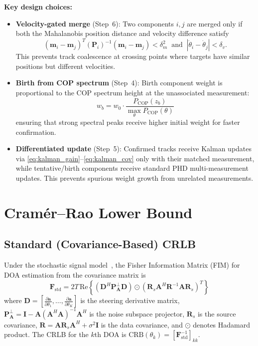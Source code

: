 \documentclass[journal]{IEEEtran}
\newcommand{\mat}[1]{\mathbf{#1}}
\newcommand{\Real}{\mathrm{Re}}
\begin{document}
\textbf{Key design choices:}
\begin{itemize}
\item \textbf{Velocity-gated merge} (Step~6): Two components $i, j$ are merged only if both the Mahalanobis position distance and velocity difference satisfy
\begin{equation}
(\mat{m}_i - \mat{m}_j)^T(\mat{P}_i)^{-1}(\mat{m}_i - \mat{m}_j) < \delta_m^2 \;\;\text{and}\;\; |\dot{\theta}_i - \dot{\theta}_j| < \delta_v.
\label{eq:vel_gated_merge}
\end{equation}
This prevents track coalescence at crossing points where targets have similar positions but different velocities.
\item \textbf{Birth from COP spectrum} (Step~4): Birth component weight is proportional to the COP spectrum height at the unassociated measurement:
\begin{equation}
w_b = w_0 \cdot \frac{P_{\mathrm{COP}}(z_b)}{\max_\theta P_{\mathrm{COP}}(\theta)}
\label{eq:birth_weight}
\end{equation}
ensuring that strong spectral peaks receive higher initial weight for faster confirmation.
\item \textbf{Differentiated update} (Step~5): Confirmed tracks receive Kalman updates via \eqref{eq:kalman_gain}--\eqref{eq:kalman_cov} only with their matched measurement, while tentative/birth components receive standard PHD multi-measurement updates. This prevents spurious weight growth from unrelated measurements.
\end{itemize}

\section{Cram\'{e}r--Rao Lower Bound}
\label{sec:crlb}

\subsection{Standard (Covariance-Based) CRLB}

Under the stochastic signal model~\cite{stoica1989music}, the Fisher Information Matrix (FIM) for DOA estimation from the covariance matrix is
\begin{equation}
\mat{F}_{\mathrm{std}} = 2T\,\Real\!\left\{(\mat{D}^H\mat{P}_{\mat{A}}^\perp\mat{D}) \odot (\mat{R}_s\mat{A}^H\mat{R}^{-1}\mat{A}\mat{R}_s)^T\right\}
\label{eq:fim_std}
\end{equation}
where $\mat{D} = [\frac{\partial\mat{a}}{\partial\theta_1}, \ldots, \frac{\partial\mat{a}}{\partial\theta_K}]$ is the steering derivative matrix, $\mat{P}_{\mat{A}}^\perp = \mat{I} - \mat{A}(\mat{A}^H\mat{A})^{-1}\mat{A}^H$ is the noise subspace projector, $\mat{R}_s$ is the source covariance, $\mat{R} = \mat{A}\mat{R}_s\mat{A}^H + \sigma^2\mat{I}$ is the data covariance, and $\odot$ denotes Hadamard product. The CRLB for the $k$th DOA is $\mathrm{CRB}(\theta_k) = [\mat{F}_{\mathrm{std}}^{-1}]_{kk}$.
\end{document}
